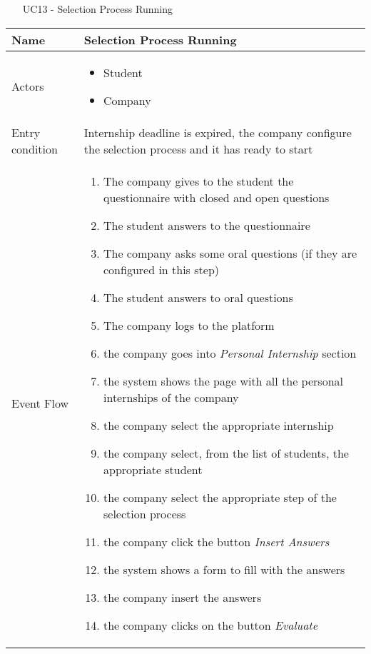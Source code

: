 				
				\begin{table} [H]
					\centering
					\begin{itemize}
						\item [UC13] - Selection Process Running
					\end{itemize}
					\begin{tabular}{|| P{7.5cm} | P{7.5cm} ||}
						\hline
						Name & Selection Process Running \\
						\hline
						Actors & \parbox{5cm}{\begin{itemize}
								\item Student
								\item Company
							\end{itemize}
						} \\
						\hline
						Entry condition & Internship deadline is expired, the company configure the selection process and it has ready to start \\
						\hline
						Event Flow & \parbox{5cm}{\begin{enumerate}[label=\alpha]
								\item The company gives to the student the questionnaire with closed and open questions
								\item The student answers to the questionnaire
								\item The company asks some oral questions (if they are configured in this step)
								\item The student answers to oral questions
								\item The company logs to the platform 
								\item the company goes into \textit{Personal Internship} section
								\item the system shows the page with all the personal internships of the company
								\item the company select the appropriate internship 
								\item the company select, from the list of students, the appropriate student
								\item the company select the appropriate step of the selection process
								\item the company click the button \textit{Insert Answers}
								\item the system shows a form to fill with the answers
								\item the company insert the answers
								\item the company clicks on the button \textit{Evaluate}

\end{enumerate}}
\end{tabular}
\end{table}
